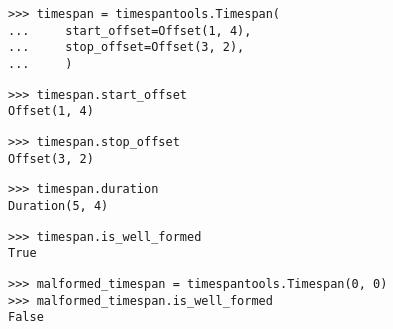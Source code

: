 \begin{singlespacing}
\vspace{-0.5\baselineskip}
\begin{lstlisting}
>>> timespan = timespantools.Timespan(
...     start_offset=Offset(1, 4),
...     stop_offset=Offset(3, 2),
...     )
\end{lstlisting}
\end{singlespacing}

\begin{comment}
<abjad>
timespan.start_offset
timespan.stop_offset
timespan.duration
timespan.is_well_formed
</abjad>
\end{comment}

\begin{singlespacing}
\vspace{-0.5\baselineskip}
\begin{lstlisting}
>>> timespan.start_offset
Offset(1, 4)
\end{lstlisting}
\begin{lstlisting}
>>> timespan.stop_offset
Offset(3, 2)
\end{lstlisting}
\begin{lstlisting}
>>> timespan.duration
Duration(5, 4)
\end{lstlisting}
\begin{lstlisting}
>>> timespan.is_well_formed
True
\end{lstlisting}
\end{singlespacing}

\begin{comment}
<abjad>
malformed_timespan = timespantools.Timespan(0, 0)
malformed_timespan.is_well_formed
</abjad>
\end{comment}

\begin{singlespacing}
\vspace{-0.5\baselineskip}
\begin{lstlisting}
>>> malformed_timespan = timespantools.Timespan(0, 0)
>>> malformed_timespan.is_well_formed
False
\end{lstlisting}
\end{singlespacing}

\begin{comment}
<abjad>
templated_timespan = new(timespan, stop_offset=(5, 16))
print(format(templated_timespan))
</abjad>
\end{comment}

